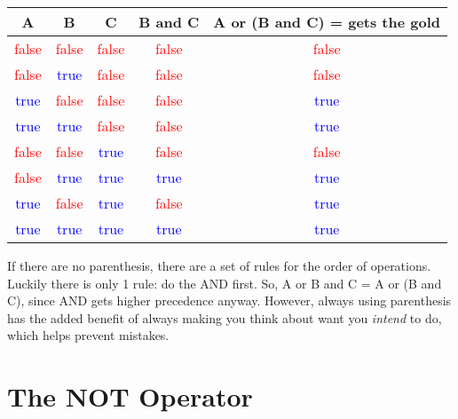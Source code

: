 \begin{center}
	\begin{tabular}{c | c | c | c | c}
		A & B & C & B and C & A or (B and C) = gets the gold\\ \hline
		\textcolor{red}{false} & \textcolor{red}{false} & \textcolor{red}{false} & \textcolor{red}{false} & \textcolor{red}{false}\\ \hline
		\textcolor{red}{false} & \textcolor{blue}{true} & \textcolor{red}{false} & \textcolor{red}{false} & \textcolor{red}{false}\\ \hline
		\textcolor{blue}{true} & \textcolor{red}{false} & \textcolor{red}{false} & \textcolor{red}{false} & \textcolor{blue}{true}\\ \hline
		\textcolor{blue}{true} & \textcolor{blue}{true} & \textcolor{red}{false} & \textcolor{red}{false} & \textcolor{blue}{true}\\ \hline

		\textcolor{red}{false} & \textcolor{red}{false} & \textcolor{blue}{true} & \textcolor{red}{false} & \textcolor{red}{false}\\ \hline
		\textcolor{red}{false} & \textcolor{blue}{true} & \textcolor{blue}{true} & \textcolor{blue}{true} & \textcolor{blue}{true}\\ \hline
		\textcolor{blue}{true} & \textcolor{red}{false} & \textcolor{blue}{true} & \textcolor{red}{false} & \textcolor{blue}{true}\\ \hline
		\textcolor{blue}{true} & \textcolor{blue}{true} & \textcolor{blue}{true} & \textcolor{blue}{true} & \textcolor{blue}{true}\\ \hline
	\end{tabular}
\end{center}


If there are no parenthesis, there are a set of rules for the order of operations. Luckily there is only 1 rule: do the AND first. So, A or B and C = A or (B and C), since AND gets higher precedence anyway. However, always using parenthesis has the added benefit of always making you think about want you \textit{intend} to do, which helps prevent mistakes.

\section{The NOT Operator}

